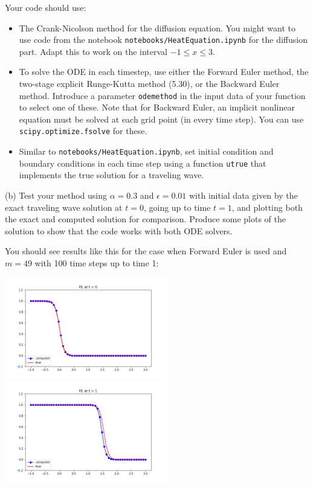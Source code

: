 \documentclass[10pt]{article}
\begin{document}
Your code should use: 
\begin{itemize} 
\item The Crank-Nicolson method for the diffusion equation. 
You might want to use code from the notebook {\tt notebooks/HeatEquation.ipynb}
for the diffusion part.  Adapt this to work on the interval $-1 \leq x \leq 3$.
\item To solve the ODE in each timestep, use either
the Forward Euler method, the two-stage explicit Runge-Kutta method (5.30), 
or the Backward Euler method.  Introduce a parameter {\tt odemethod}
in the input data of your function to select one of these.
Note that for Backward Euler, an implicit nonlinear equation must be solved at 
each grid point (in every time step).  You can use {\tt scipy.optimize.fsolve}
for these.
\item Similar to {\tt notebooks/HeatEquation.ipynb}, set initial condition and
boundary conditions in each time step using 
a function {\tt utrue} that implements the true solution for a traveling wave.
\end{itemize} 

(b) Test your method using $\alpha=0.3$ and $\epsilon = 0.01$ with
initial data given by the exact traveling wave solution at $t=0$,
going up to time $t=1$, and plotting both the exact and computed
solution for comparison.  Produce some plots of the solution to
show that the code works with both ODE solvers.

You should see results like this for the case when Forward Euler is used and
$m=49$ with 100 time steps up to time 1:

\hfil\includegraphics[width=2.8in]{figs/ACwithFE0.png}\hfil
\hfil\includegraphics[width=2.8in]{figs/ACwithFE1.png}\hfil
\end{document}
